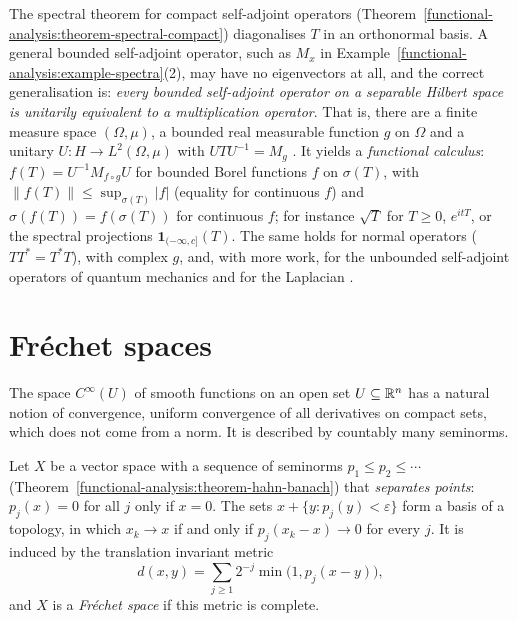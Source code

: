 \begin{remark}\label{functional-analysis:remark-spectral-theorem}
The spectral theorem for compact self-adjoint operators (Theorem~\ref{functional-analysis:theorem-spectral-compact}) diagonalises $T$ in an orthonormal basis. A general bounded self-adjoint operator, such as
$M_x$ in Example~\ref{functional-analysis:example-spectra}(2), may have no eigenvectors at all, and the correct generalisation is: \emph{every bounded self-adjoint operator on a separable Hilbert space is unitarily
equivalent to a multiplication operator}. That is, there are a finite measure space $(\Omega, \mu)$, a bounded real measurable function $g$ on $\Omega$ and a unitary $U \colon H \to L^2(\Omega, \mu)$ with
$UTU^{-1} = M_g$ \cite[Chapter VII]{reed-simon-1}. It yields a \emph{functional calculus}: $f(T) = U^{-1}M_{f \circ g}U$ for bounded Borel functions $f$ on $\sigma(T)$, with $\|f(T)\| \leq \sup_{\sigma(T)}|f|$ (equality
for continuous $f$) and $\sigma(f(T)) = f(\sigma(T))$ for continuous $f$; for instance $\sqrt{T}$ for $T \geq 0$, $e^{itT}$, or the spectral projections $\mathbf{1}_{(-\infty, c]}(T)$. The same holds for normal operators
($TT^* = T^*T$), with complex $g$, and, with more work, for the unbounded self-adjoint operators of quantum mechanics and for the Laplacian \cite[Chapter VIII]{reed-simon-1}.
\end{remark}

\section{Fr\'echet spaces}\label{functional-analysis:section-frechet}

The space $C^\infty(U)$ of smooth functions on an open set $U \subseteq \mathbb{R}^n$ has a natural notion of convergence, uniform convergence of all derivatives on compact sets, which does not come from a
norm. It is described by countably many seminorms.

\begin{definition}\label{functional-analysis:definition-frechet}
Let $X$ be a vector space with a sequence of seminorms $p_1 \leq p_2 \leq \cdots$ (Theorem~\ref{functional-analysis:theorem-hahn-banach}) that \emph{separates points}: $p_j(x) = 0$ for all $j$ only if
$x = 0$. The sets $x + \{y : p_j(y) < \varepsilon\}$ form a basis of a topology, in which $x_k \to x$ if and only if $p_j(x_k - x) \to 0$ for every $j$. It is induced by the translation invariant metric
\[
d(x, y) = \sum_{j \geq 1}2^{-j}\min\bigl(1, p_j(x - y)\bigr),
\]
and $X$ is a \emph{Fr\'echet space} if this metric is complete.
\end{definition}

